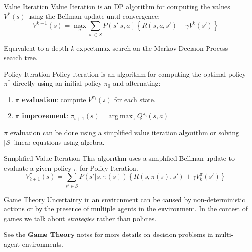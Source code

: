 \documentclass{cognito}
\begin{document}
\begin{note}{Value Iteration}
	Value Iteration is an DP algorithm for computing the values $V^*(s)$ using the Bellman update
	until convergence:
	$$
		V^{k+1}(s) = \max_a  \sum_{s' \in S} P(s' | s, a) \left\{ R(s,a,s') + \gamma V^k(s') \right\}
	$$
	\begin{remark} Equivalent to a depth-$k$ expectimax search on the Markov Decision Process search tree.
	\end{remark}
	\vspace{-5pt}
\end{note}


\begin{note}{Policy Iteration}
	Policy Iteration is an algorithm for computing the optimal policy $\pi^*$ directly using an initial policy $\pi_0$ and alternating:
	\begin{enumerate}
		\item {\bf $\pi$ evaluation}: compute $V^{\pi_i}(s)$ for each state.
		\item {\bf $\pi$ improvement}: $\pi_{i+1}(s) = \text{arg}\max_a Q^{\pi_i}(s, a)$
	\end{enumerate}
	\begin{remark} $\pi$ evaluation can be done using a simplified value iteration algorithm
		or solving $|S|$ linear equations using algebra.
	\end{remark}
	\vspace{-5pt}
\end{note}

\begin{note}{Simplified Value Iteration}
	This algorithm uses a simplified Bellman update to evaluate a given policy $\pi$ for Policy Iteration.
	$$
		V^{\pi}_{k+1}(s) =  \sum_{s' \in S} P(s' | s, \pi(s)) \left\{ R(s,\pi(s),s') + \gamma V^{\pi}_k(s') \right\}
	$$
	\vspace{-10pt}
\end{note}




\begin{note}{Game Theory}
	Uncertainty in an environment can be caused by non-deterministic actions or by
	the presence of multiple agents in the environment.
	In the contest of games we talk about \emph{strategies} rather than policies.
	\vspace{5pt}

	See the \textbf{Game Theory} \noteref notes for more details on decision problems in multi-agent environments.
\end{note}
\end{document}
